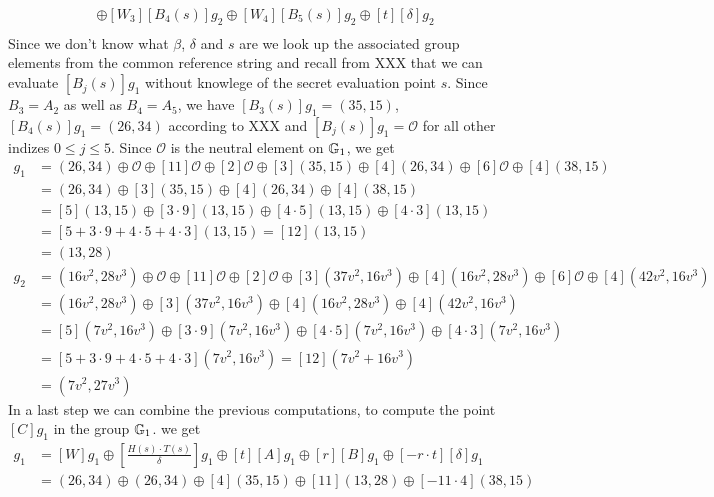\begin{example}
\begin{align*}
       & \oplus [W_3][B_4(s)]g_2\oplus [W_4][B_5(s)]g_2\oplus [t][\delta]g_2\\       
\end{align*}
Since we don't know what $\beta$, $\delta$ and $s$ are we look up the associated group elements from the common reference string and recall from XXX that we can evaluate $[B_j(s)]g_1$ without knowlege of the secret evaluation point $s$. Since $B_3=A_2$ as well as $B_4=A_5$, we have $[B_3(s)]g_1=(35,15)$, $[B_4(s)]g_1=(26,34)$ according to XXX and $[B_j(s)]g_1=\mathcal{O}$ for all other indizes $0\leq j\leq 5$. Since $\mathcal{O}$ is the neutral element on $\mathbb{G}_1$, we get
\begin{align*}
[B]g_1 &= (26,34) \oplus \mathcal{O}\oplus [11]\mathcal{O}\oplus [2]\mathcal{O} \oplus [3](35,15) \oplus [4](26,34)\oplus [6]\mathcal{O}\oplus [4](38,15)\\    
       &= (26,34)\oplus [3](35,15) \oplus [4](26,34)\oplus [4](38,15)\\  
       &= [5](13,15)\oplus [3\cdot 9](13,15) \oplus [4\cdot 5](13,15)\oplus [4\cdot 3](13,15)\\        
       &= [5+3\cdot 9+4\cdot 5+4\cdot 3](13,15) = [12](13,15) \\
       &= (13,28)
\end{align*}
\begin{align*}
[B]g_2 &=(16v^2,28v^3) \oplus \mathcal{O} \oplus [11]\mathcal{O}\oplus [2]\mathcal{O} \oplus [3](37v^2,16v^3)\oplus [4](16v^2,28v^3)\oplus [6]\mathcal{O}\oplus [4](42v^2,16v^3)\\    
         &=(16v^2,28v^3)\oplus [3](37v^2,16v^3)\oplus [4](16v^2,28v^3)\oplus [4](42v^2,16v^3)\\
         &=[5](7v^2,16v^3)\oplus [3\cdot 9](7v^2,16v^3)\oplus [4\cdot 5](7v^2,16v^3)\oplus [4\cdot 3](7v^2,16v^3)\\          
         &=[5+3\cdot 9+4\cdot 5+4\cdot 3](7v^2,16v^3)=[12](7v^2+16v^3)\\
         &= (7v^2,27v^3)     
\end{align*}
In a last step we can combine the previous computations, to compute the point $[C]g_1$ in the group $\mathbb{G}_1$. we get
\begin{align*}
[C]g_1 & = [W]g_1\oplus [\frac{H(s)\cdot T(s)}{\delta}]g_1 \oplus [t][A]g_1 \oplus [r][B]g_1 \oplus [-r\cdot t][\delta]g_1\\
       & = (26,34)\oplus (26,34) \oplus [4](35,15) \oplus [11](13,28) \oplus [-11\cdot 4](38,15)\\       

\end{align*}
\end{example}

